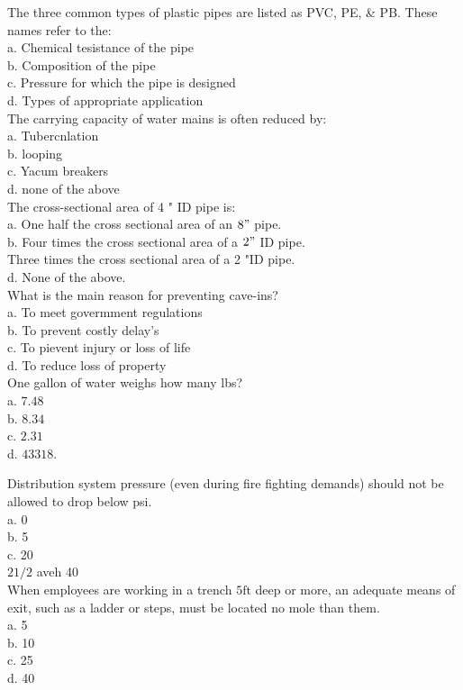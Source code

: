 The three common types of plastic pipes are listed as PVC, PE, \& PB. These names refer to the:\\
a. Chemical tesistance of the pipe\\
b. Composition of the pipe\\
c. Pressure for which the pipe is designed\\
d. Types of appropriate application\\

The carrying capacity of water mains is often reduced by:\\
a. Tubercnlation\\
b. looping\\
c. Yacum breakers\\
d. none of the above\\

The cross-sectional area of 4 " ID pipe is:\\
a. One half the cross sectional area of an $8 "$ pipe.\\
b. Four times the cross sectional area of a $2 "$ ID pipe.\\

Three times the cross sectional area of a 2 "ID pipe.\\
d. None of the above.\\

What is the main reason for preventing cave-ins?\\
a. To meet govermment regulations\\
b. To prevent costly delay's\\
c. To pievent injury or loss of life\\
d. To reduce loss of property\\

One gallon of water weighs how many lbs?\\
a. $7.48$\\
b. $8.34$\\
c. $2.31$\\
d. $433 18$.

Distribution system pressure (even during fire fighting demands) should not be allowed to drop below psi.\\
a. 0\\
b. 5\\
c. 20\\
$21 / 2$ aveh 40\\

When employees are working in a trench $5 \mathrm{ft}$ deep or more, an adequate means of exit, such as a ladder or steps, must be located no mole than them.\\
a. 5\\
b. 10\\
c. 25\\
d. 40\\

